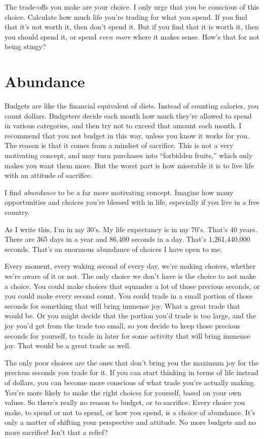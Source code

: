 The trade-offs you make are your choice. I only urge that you be conscious of this choice. Calculate how much life you're trading for what you spend. If you find that it's not worth it, then don't spend it. But if you find that it is worth it, then you should spend it, or spend \emph{even more} where it makes sense. How's that for not being stingy?

\section{Abundance}
Budgets are like the financial equivalent of diets. Instead of counting calories, you count dollars. Budgeters decide each month how much they're allowed to spend in various categories, and then try not to exceed that amount each month. I recommend that you not budget in this way, unless you know it works for you. The reason is that it comes from a mindset of sacrifice. This is not a very motivating concept, and may turn purchases into ``forbidden fruits,'' which only makes you want them more. But the worst part is how miserable it is to live life with an attitude of sacrifice.

I find \emph{abundance} to be a far more motivating concept. Imagine how many opportunities and choices you're blessed with in life, especially if you live in a free country.

As I write this, I'm in my 30's. My life expectancy is in my 70's. That's 40 years. There are 365 days in a year and 86,400 seconds in a day. That's 1,261,440,000 seconds. That's an enormous abundance of choices I have open to me.

Every moment, every waking second of every day, we're making choices, whether we're aware of it or not. The only choice we don't have is the choice to not make a choice. You could make choices that squander a lot of those precious seconds, or you could make every second count. You could trade in a small portion of those seconds for something that will bring immense joy. What a great trade that would be. Or you might decide that the portion you'd trade is too large, and the joy you'd get from the trade too small, so you decide to keep those precious seconds for yourself, to trade in later for some activity that will bring immense joy. That would be a great trade as well.

The only poor choices are the ones that don't bring you the maximum joy for the precious seconds you trade for it. If you can start thinking in terms of life instead of dollars, you can become more conscious of what trade you're actually making. You're more likely to make the right choices for yourself, based on your own values. So there's really no reason to budget, or to sacrifice. Every choice you make, to spend or not to spend, or how you spend, is a choice of abundance. It's only a matter of shifting your perspective and attitude. No more budgets and no more sacrifice! Isn't that a relief?

